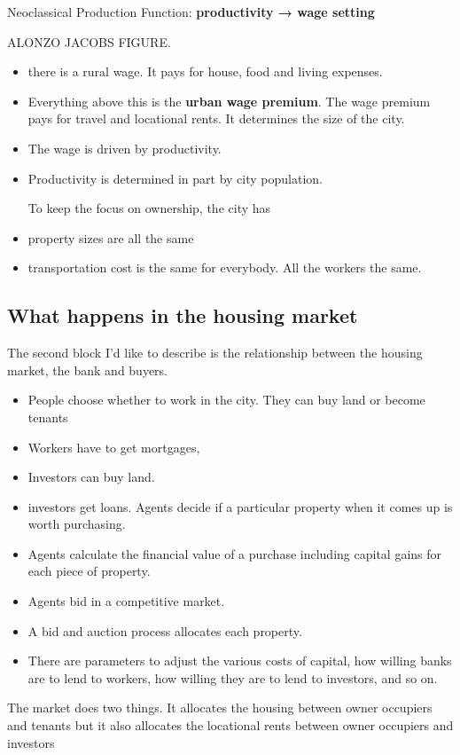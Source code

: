 \documentclass[]{article}
\begin{document}
Neoclassical Production Function: \textbf{productivity → wage setting}

\hspace{4cm}ALONZO JACOBS FIGURE. %

\begin{itemize}
    \item  there is a rural wage. It pays for house, food and living expenses. 
    \item Everything above this is the \textbf{urban wage premium}. The wage premium pays for travel and locational rents. It determines the size of the city.
    
    \item The wage is driven by productivity. 
    
    \item Productivity is determined in part by city population. 
    
    To keep the focus on ownership, the city has

    \item property sizes are all the same

    \item transportation cost is the same for everybody.  All the workers the same.
\end{itemize}

\subsection{ What happens in the housing market}
The second block I’d like to describe is the relationship between the housing market, the bank and buyers. 

\begin{itemize}
    \item People choose whether to work in the city. They can buy land or become tenants
    
    \item Workers have to get mortgages,

    \item Investors can buy land.

    \item investors get loans. Agents decide if a particular property when it comes up is worth purchasing.

    \item Agents calculate the financial value of a purchase including capital gains for each piece of property.

    \item Agents bid in a competitive market.

    \item A bid and auction process allocates each property.

    \item There are parameters to adjust the various costs of capital, how willing banks are to lend to workers, how willing they are to lend to investors, and so on.
\end{itemize}
The market does two things. It allocates the housing between owner occupiers and tenants but it also allocates the locational rents between owner occupiers and investors
\end{document}
